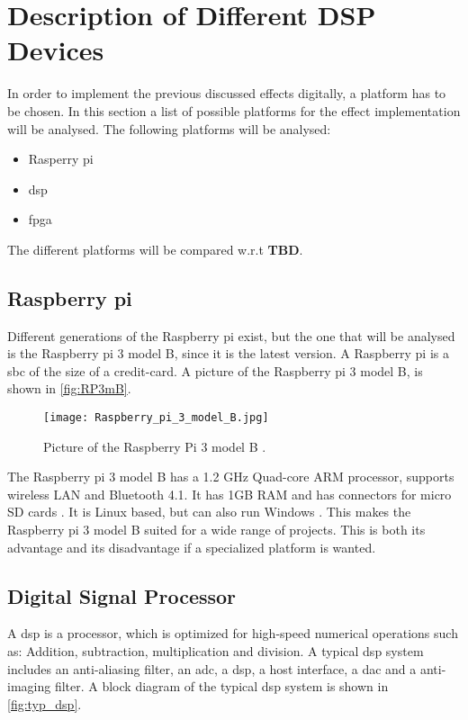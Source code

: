 \section{Description of Different DSP Devices}
In order to implement the previous discussed effects digitally, a platform has to be chosen. In this section a list of possible platforms for the effect implementation will be analysed. The following platforms will be analysed:

\begin{itemize}
\item Rasperry pi
\item \gls{dsp}
\item \gls{fpga}
\end{itemize}

The different platforms will be compared w.r.t \textbf{TBD}.

\subsection{Raspberry pi}
Different generations of the Raspberry pi exist, but the one that will be analysed is the Raspberry pi 3 model B, since it is the latest version. 
A Raspberry pi is a \gls{sbc} of the size of a credit-card. A picture of the Raspberry pi 3 model B, is shown in \autoref{fig:RP3mB}.

\begin{figure}[h]
	\centering
		\texttt{[image: Raspberry\_pi\_3\_model\_B.jpg]}
		\caption{Picture of the Raspberry Pi 3 model B \cite{Rasperry_pi}.}
		\label{fig:RP3mB}
\end{figure}

The Raspberry pi 3 model B has a 1.2 GHz Quad-core ARM processor, supports wireless LAN and Bluetooth 4.1. It has 1GB RAM and has connectors for micro SD cards \cite{Raspberry_pi}.
It is Linux based, but can also run Windows \cite{sparkfun_Raspberry_pi}. This makes the Raspberry pi 3 model B suited for a wide range of projects. This is both its advantage and its disadvantage if a specialized platform is wanted. 



\subsection{Digital Signal Processor}
A \gls{dsp} is a processor, which is optimized for high-speed numerical operations such as: Addition, subtraction, multiplication and division. A typical \gls{dsp} system includes an anti-aliasing filter, an \gls{adc}, a \gls{dsp}, a host interface, a \gls{dac} and a anti-imaging filter. A block diagram of the typical \gls{dsp} system is shown in \autoref{fig:typ_dsp}.

